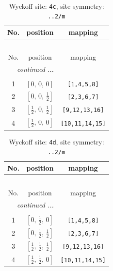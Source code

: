 \documentclass[fleqn,8pt]{jsarticle}
\begin{document}
\renewcommand{\arraystretch}{1.2}
\begin{longtable}{ccc}
\caption{Wyckoff site: {\tt 4c}, site symmetry: {\tt ..2/m}}
 \\
 \hline \hline
No. & position & mapping \\ \hline \endfirsthead

\multicolumn{2}{l}{\tablename\ \thetable{}} \\
 \hline \hline
No. & position & mapping \\ \hline \endhead

 \hline \hline
\multicolumn{2}{r}{\footnotesize\it continued ...} \\ \endfoot

 \hline \hline
\multicolumn{2}{r}{} \\ \endlastfoot

1 & $\left[ 0,\, 0,\, 0 \right]$ & {\tt [1,4,5,8]} \\ \hline
2 & $\left[ 0,\, 0,\, \frac{1}{2} \right]$ & {\tt [2,3,6,7]} \\ \hline
3 & $\left[ \frac{1}{2},\, 0,\, \frac{1}{2} \right]$ & {\tt [9,12,13,16]} \\ \hline
4 & $\left[ \frac{1}{2},\, 0,\, 0 \right]$ & {\tt [10,11,14,15]} \\
\end{longtable}
\renewcommand{\arraystretch}{1.2}
\begin{longtable}{ccc}
\caption{Wyckoff site: {\tt 4d}, site symmetry: {\tt ..2/m}}
 \\
 \hline \hline
No. & position & mapping \\ \hline \endfirsthead

\multicolumn{2}{l}{\tablename\ \thetable{}} \\
 \hline \hline
No. & position & mapping \\ \hline \endhead

 \hline \hline
\multicolumn{2}{r}{\footnotesize\it continued ...} \\ \endfoot

 \hline \hline
\multicolumn{2}{r}{} \\ \endlastfoot

1 & $\left[ 0,\, \frac{1}{2},\, 0 \right]$ & {\tt [1,4,5,8]} \\ \hline
2 & $\left[ 0,\, \frac{1}{2},\, \frac{1}{2} \right]$ & {\tt [2,3,6,7]} \\ \hline
3 & $\left[ \frac{1}{2},\, \frac{1}{2},\, \frac{1}{2} \right]$ & {\tt [9,12,13,16]} \\ \hline
4 & $\left[ \frac{1}{2},\, \frac{1}{2},\, 0 \right]$ & {\tt [10,11,14,15]} \\
\end{longtable}
\end{document}
